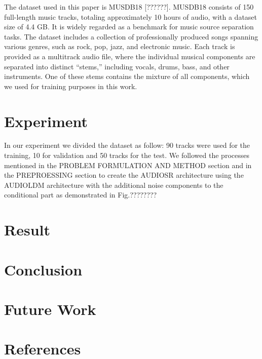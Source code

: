 \documentclass[
  ]{scrartcl}
\begin{document}
The dataset used in this paper is MUSDB18 {[}??????{]}. MUSDB18 consists
of 150 full-length music tracks, totaling approximately 10 hours of
audio, with a dataset size of 4.4 GB. It is widely regarded as a
benchmark for music source separation tasks. The dataset includes a
collection of professionally produced songs spanning various genres,
such as rock, pop, jazz, and electronic music. Each track is provided as
a multitrack audio file, where the individual musical components are
separated into distinct ``stems,'' including vocals, drums, bass, and
other instruments. One of these stems contains the mixture of all
components, which we used for training purposes in this work.

\section{Experiment}\label{experiment}

In our experiment we divided the dataset as follow: 90 tracks were used
for the training, 10 for validation and 50 tracks for the test. We
followed the processes mentioned in the PROBLEM FORMULATION AND METHOD
section and in the PREPROESSING section to create the AUDIOSR
architecture using the AUDIOLDM architecture with the additional noise
components to the conditional part as demonstrated in Fig.????????

\section{Result}\label{result}

\section{Conclusion}\label{conclusion}

\section{Future Work}\label{future-work}

\section{References}\label{references}
\end{document}
